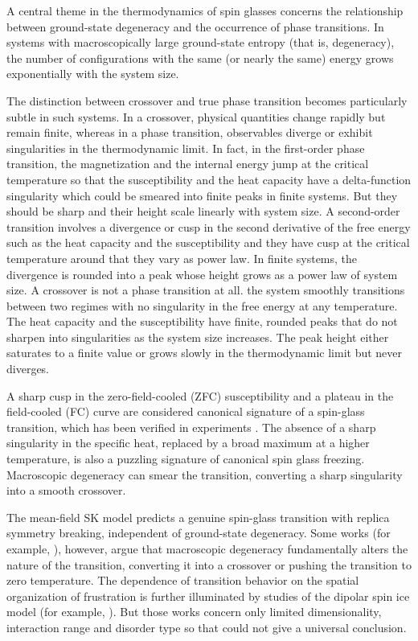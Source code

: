 \documentclass[
    aps,
    prb,
    reprint,           %
    superscriptaddress,%
    amsmath,amssymb,
    floatfix
]{revtex4-2}
\begin{document}
A central theme in the thermodynamics of spin glasses concerns the relationship between ground-state degeneracy and the occurrence of phase transitions. In systems with macroscopically large ground-state entropy (that is, degeneracy), the number of configurations with the same (or nearly the same) energy grows exponentially with the system size.

The distinction between crossover and true phase transition becomes particularly subtle in such systems. In a crossover, physical quantities change rapidly but remain finite, whereas in a phase transition, observables diverge or exhibit singularities in the thermodynamic limit. 
In fact, in the first-order phase transition, the magnetization and the internal energy jump at the critical temperature so that the susceptibility and the heat capacity have a delta-function singularity which could be smeared into finite peaks in finite systems. But they should be sharp and their height scale linearly with system size. A second-order transition involves a divergence or cusp in the second derivative of the free energy such as the heat capacity and the susceptibility and they have cusp at the critical temperature around that they vary as power law. In finite systems, the divergence is rounded into a peak whose height grows as a power law of system size. A crossover is not a phase transition at all. the system smoothly transitions between two regimes with no singularity in the free energy at any temperature. The heat capacity and the susceptibility have finite, rounded peaks that do not sharpen into singularities as the system size increases. The peak height either saturates to a finite value or grows slowly in the thermodynamic limit but never diverges.

A sharp cusp in the zero-field-cooled (ZFC) susceptibility and a plateau in the field-cooled (FC) curve are considered canonical signature of a spin-glass transition, which has been verified in experiments \cite{Sorensen2021}. The absence of a sharp singularity in the specific heat, replaced by a broad maximum at a higher temperature, is also a puzzling signature of canonical spin glass freezing.
Macroscopic degeneracy can smear the transition, converting a sharp singularity into a smooth crossover.

The mean-field SK model predicts a genuine spin-glass transition with replica symmetry breaking, independent of ground-state degeneracy. Some works (for example, \cite{Miyashita1983}), however, argue that macroscopic degeneracy fundamentally alters the nature of the transition, converting it into a crossover or pushing the transition to zero temperature. The dependence of transition behavior on the spatial organization of frustration is further illuminated by studies of the dipolar spin ice model (for example, \cite{Melko2004}). But those works concern only limited dimensionality, interaction range and disorder type so that could not give a universal conclusion.
\end{document}
